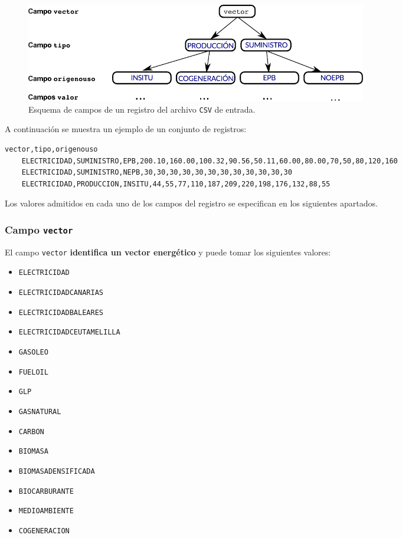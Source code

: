 \documentclass[10pt,notitlepage,oneside,a4paper]{article}
\begin{document}
\begin{figure}[H]
\centering
\includegraphics[width=15cm]{esquemavectores}
\caption{Esquema de campos de un registro del archivo \texttt{CSV} de entrada.}
\label{fig:estructuraVectores}
\end{figure}

A continuación se muestra un ejemplo de un conjunto de registros:

\begin{Verbatim}[fontsize=\small,frame=single]
    vector,tipo,origenouso
    ELECTRICIDAD,SUMINISTRO,EPB,200.10,160.00,100.32,90.56,50.11,60.00,80.00,70,50,80,120,160
    ELECTRICIDAD,SUMINISTRO,NEPB,30,30,30,30,30,30,30,30,30,30,30,30
    ELECTRICIDAD,PRODUCCION,INSITU,44,55,77,110,187,209,220,198,176,132,88,55
\end{Verbatim}

Los valores admitidos en cada uno de los campos del registro se especifican en los siguientes apartados.

\subsubsection{Campo \texttt{vector}}

El campo \texttt{vector} \textbf{identifica un vector energético} y puede tomar los siguientes valores:

\begin{multicols}{3}
\begin{itemize}
\item \texttt{ELECTRICIDAD}
\item \texttt{ELECTRICIDADCANARIAS}
\item \texttt{ELECTRICIDADBALEARES}
\item \texttt{ELECTRICIDADCEUTAMELILLA}
\item \texttt{GASOLEO}
\item \texttt{FUELOIL}
\item \texttt{GLP}
\item \texttt{GASNATURAL}
\item \texttt{CARBON}
\item \texttt{BIOMASA}
\item \texttt{BIOMASADENSIFICADA}
\item \texttt{BIOCARBURANTE}
\item \texttt{MEDIOAMBIENTE}
\item \texttt{COGENERACION}
\end{itemize}
\end{multicols}
\end{document}
